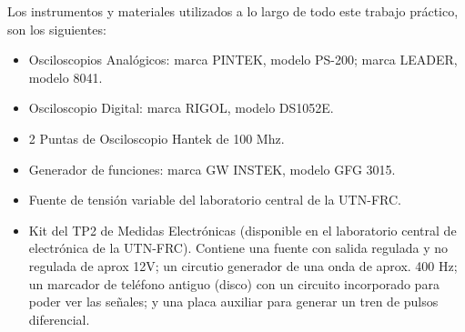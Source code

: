 Los instrumentos y materiales utilizados a lo largo de todo este trabajo práctico, son los siguientes:

\begin{itemize}
    \item Osciloscopios Analógicos: marca PINTEK, modelo PS-200; marca LEADER, modelo 8041.
    \item Osciloscopio Digital: marca RIGOL, modelo DS1052E.
    \item 2 Puntas de Osciloscopio Hantek de 100 Mhz.
    \item Generador de funciones: marca GW INSTEK, modelo GFG 3015.
    \item Fuente de tensión variable del laboratorio central de la UTN-FRC.
    \item Kit del TP2 de Medidas Electrónicas (disponible en el laboratorio central de electrónica de la UTN-FRC). Contiene una fuente con salida regulada y no regulada de aprox 12V; un circutio generador de una onda de aprox. 400 Hz; un marcador de teléfono antiguo (disco) con un circuito incorporado para poder ver las señales; y una placa auxiliar para generar un tren de pulsos diferencial.
    
\end{itemize}